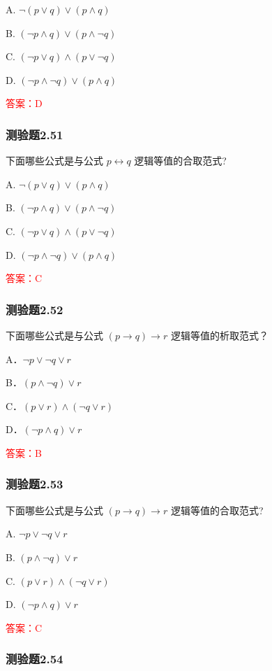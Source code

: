 \documentclass[UTF8, heading=true]{ctexart}
\begin{document}
A. $\neg(p \vee q) \vee(p \wedge q)$

B. $(\neg p \wedge q) \vee(p \wedge \neg q)$

C. $(\neg p \vee q) \wedge(p \vee \neg q)$

D. $(\neg p \wedge \neg q) \vee(p \wedge q)$

\textcolor{red}{答案：D}

\subsubsection{测验题2.51}

下面哪些公式是与公式 $p \leftrightarrow q$ 逻辑等值的合取范式?

A. $\neg(p \vee q) \vee(p \wedge q)$

B. $(\neg p \wedge q) \vee(p \wedge \neg q)$

C. $(\neg p \vee q) \wedge(p \vee \neg q)$

D. $(\neg p \wedge \neg q) \vee(p \wedge q)$

\textcolor{red}{答案：C}

\subsubsection{测验题2.52}

下面哪些公式是与公式 $(p \rightarrow q) \rightarrow r$ 逻辑等值的析取范式？

A．$\neg p \vee \neg q \vee r$

B．$(p \wedge \neg q) \vee r$

C．$(p \vee r) \wedge(\neg q \vee r)$

D．$(\neg p \wedge q) \vee r$

\textcolor{red}{答案：B}

\subsubsection{测验题2.53}

下面哪些公式是与公式 $(p \rightarrow q) \rightarrow r$ 逻辑等值的合取范式?

A. $ \neg p \vee \neg q \vee r$

B. $(p \wedge \neg q) \vee r$

C. $(p \vee r) \wedge(\neg q \vee r)$

D. $(\neg p \wedge q) \vee r$

\textcolor{red}{答案：C}

\subsubsection{测验题2.54}
\end{document}
